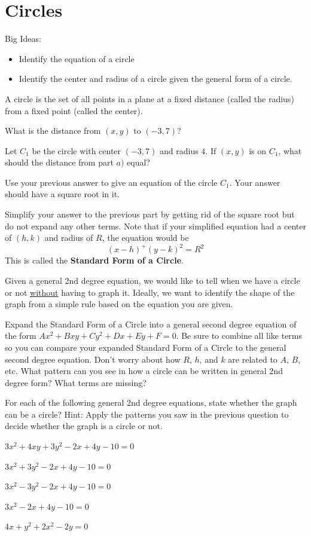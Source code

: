 \section{Circles}
Big Ideas:
\begin{itemize}
\item Identify the equation of a circle
\item Identify the center and radius of a circle given the general form of a circle.
\end{itemize}
\begin{info} A circle is the set of all points in a plane at a fixed distance (called the radius) from a fixed point (called the center).
\end{info}
\bq
\be
\item What is the distance from $(x,y)$ to $(-3,7)$?
\item Let $C_1$ be the circle with center $(-3,7)$ and radius $4$. If $(x,y)$ is on $C_1$, what should the distance from part $a)$ equal?
\item Use your previous answer to give an equation of the circle $C_1$. Your answer should have a square root in it.
\item Simplify your answer to the previous part by getting rid of the square root but do not expand any other terms.
\ee \eq
Note that if your simplified equation had a center of $(h,k)$ and radius of $R$, the equation would be $$(x-h)^+(y-k)^2=R^2$$ This is called the \textbf{Standard Form of a Circle}.

Given a general 2nd degree equation, we would like to tell when we have a circle or not \underline{without} having to graph it. Ideally, we want to identify the shape of the graph from a simple rule based on the equation you are given.

\bq Expand the Standard Form of a Circle into a general second degree equation of the form $Ax^2+Bxy+Cy^2+Dx+Ey+F=0$. Be sure to combine all like terms so you can compare your expanded Standard Form of a Circle to the general second degree equation. Don't worry about how $R$, $h$, and $k$ are related to $A$, $B$, etc. What pattern can you see in how a circle can be written in general 2nd degree form? What terms are missing?
\eq

\bq For each of the following general 2nd degree equations, state whether the graph can be a circle? Hint: Apply the patterns you saw in the previous question to decide whether the graph is a circle or not.
\be
\item $3x^2+4xy+3y^2-2x+4y-10=0$
\item $3x^2+3y^2-2x+4y-10=0$
\item $3x^2-3y^2-2x+4y-10=0$
\item $3x^2-2x+4y-10=0$
\item $4x+y^2+2x^2-2y=0$
\ee
\eq

